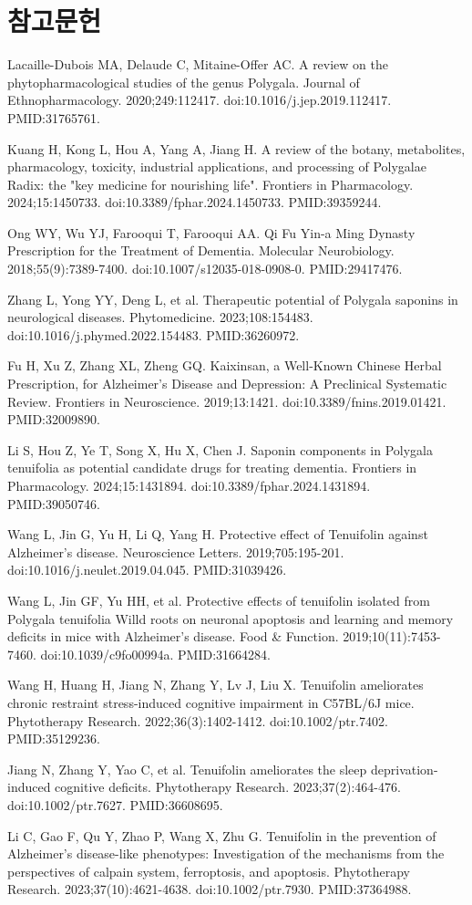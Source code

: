 \documentclass[11pt,oneside]{book}
\newcommand{\refstart}{\par\begingroup\footnotesize\setlength{\parskip}{2.5pt}\raggedright}
\newcommand{\reff}[2]{\par\hangindent=7mm\hangafter=1\noindent[#1]\hspace{2mm}#2\par}
\begin{document}
\section*{참고문헌}
\refstart
\reff{1}{Lacaille-Dubois MA, Delaude C, Mitaine-Offer AC. A review on the phytopharmacological studies of the genus Polygala. Journal of Ethnopharmacology. 2020;249:112417. doi:10.1016/j.jep.2019.112417. PMID:31765761.}
\reff{2}{Kuang H, Kong L, Hou A, Yang A, Jiang H. A review of the botany, metabolites, pharmacology, toxicity, industrial applications, and processing of Polygalae Radix: the "key medicine for nourishing life". Frontiers in Pharmacology. 2024;15:1450733. doi:10.3389/fphar.2024.1450733. PMID:39359244.}
\reff{3}{Ong WY, Wu YJ, Farooqui T, Farooqui AA. Qi Fu Yin-a Ming Dynasty Prescription for the Treatment of Dementia. Molecular Neurobiology. 2018;55(9):7389-7400. doi:10.1007/s12035-018-0908-0. PMID:29417476.}
\reff{4}{Zhang L, Yong YY, Deng L, et al. Therapeutic potential of Polygala saponins in neurological diseases. Phytomedicine. 2023;108:154483. doi:10.1016/j.phymed.2022.154483. PMID:36260972.}
\reff{5}{Fu H, Xu Z, Zhang XL, Zheng GQ. Kaixinsan, a Well-Known Chinese Herbal Prescription, for Alzheimer's Disease and Depression: A Preclinical Systematic Review. Frontiers in Neuroscience. 2019;13:1421. doi:10.3389/fnins.2019.01421. PMID:32009890.}
\reff{6}{Li S, Hou Z, Ye T, Song X, Hu X, Chen J. Saponin components in Polygala tenuifolia as potential candidate drugs for treating dementia. Frontiers in Pharmacology. 2024;15:1431894. doi:10.3389/fphar.2024.1431894. PMID:39050746.}
\reff{7}{Wang L, Jin G, Yu H, Li Q, Yang H. Protective effect of Tenuifolin against Alzheimer's disease. Neuroscience Letters. 2019;705:195-201. doi:10.1016/j.neulet.2019.04.045. PMID:31039426.}
\reff{8}{Wang L, Jin GF, Yu HH, et al. Protective effects of tenuifolin isolated from Polygala tenuifolia Willd roots on neuronal apoptosis and learning and memory deficits in mice with Alzheimer's disease. Food \& Function. 2019;10(11):7453-7460. doi:10.1039/c9fo00994a. PMID:31664284.}
\reff{9}{Wang H, Huang H, Jiang N, Zhang Y, Lv J, Liu X. Tenuifolin ameliorates chronic restraint stress-induced cognitive impairment in C57BL/6J mice. Phytotherapy Research. 2022;36(3):1402-1412. doi:10.1002/ptr.7402. PMID:35129236.}
\reff{10}{Jiang N, Zhang Y, Yao C, et al. Tenuifolin ameliorates the sleep deprivation-induced cognitive deficits. Phytotherapy Research. 2023;37(2):464-476. doi:10.1002/ptr.7627. PMID:36608695.}
\reff{11}{Li C, Gao F, Qu Y, Zhao P, Wang X, Zhu G. Tenuifolin in the prevention of Alzheimer's disease-like phenotypes: Investigation of the mechanisms from the perspectives of calpain system, ferroptosis, and apoptosis. Phytotherapy Research. 2023;37(10):4621-4638. doi:10.1002/ptr.7930. PMID:37364988.}
\end{document}
